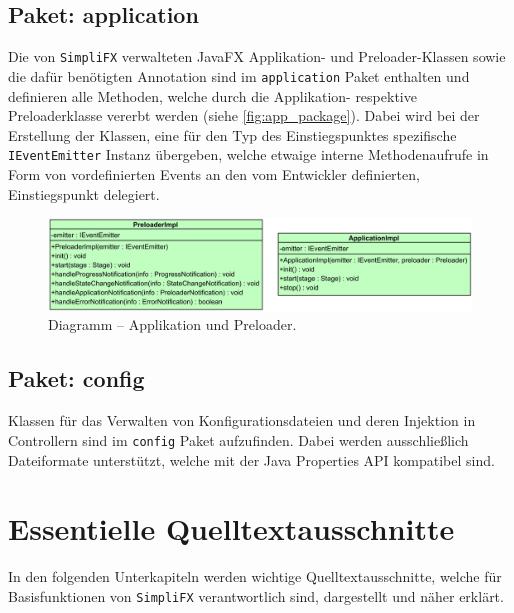 \subsection{Paket: application}
Die von \texttt{SimpliFX} verwalteten JavaFX Applikation- und Preloader-Klassen sowie die dafür benötigten Annotation sind im \texttt{application} Paket enthalten und definieren alle Methoden, welche durch die Applikation- respektive Preloaderklasse vererbt werden (siehe \autoref{fig:app_package}). Dabei wird bei der Erstellung der Klassen, eine für den Typ des Einstiegspunktes spezifische \texttt{IEventEmitter} Instanz übergeben, welche etwaige interne Methodenaufrufe in Form von vordefinierten Events an den vom Entwickler definierten, Einstiegspunkt delegiert.
\begin{figure}[H]
	\centering
	\includegraphics[width=\textwidth-2cm]{Abbildungen/Applikation und Preloader.png}
	\caption{Diagramm -- Applikation und Preloader.}
	\label{fig:app_package}
\end{figure}
\subsection{Paket: config}
Klassen für das Verwalten von Konfigurationsdateien und deren Injektion in Controllern sind im \texttt{config} Paket aufzufinden. Dabei werden ausschließlich Dateiformate unterstützt, welche mit der Java Properties API kompatibel sind.
\section{Essentielle Quelltextausschnitte}
In den folgenden Unterkapiteln werden wichtige Quelltextausschnitte, welche für Basisfunktionen von \texttt{SimpliFX} verantwortlich sind, dargestellt und näher erklärt.
